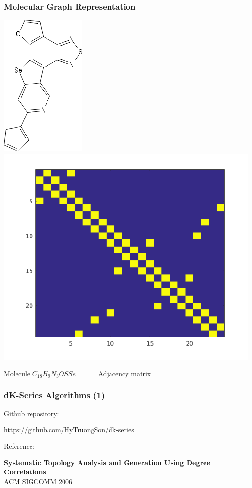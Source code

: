 \documentclass{beamer}
\begin{document}
\begin{frame}
\frametitle{Molecular Graph Representation}
\begin{justify}
\begin{center}
	\includegraphics[scale=0.5]{sketcher}
	\includegraphics[scale=0.5]{adjacency}
\end{center}
\begin{center}
Molecule $C_{18}H_9N_3OSSe$ \ \ \ \ \ \ Adjacency matrix
\end{center}
\end{justify}
\end{frame}

\begin{frame}
\frametitle{dK-Series Algorithms (1)}
\begin{justify}
Github repository: 
\begin{center}
\url{https://github.com/HyTruongSon/dk-series}
\end{center}
Reference: 
\begin{center}
\textbf{Systematic Topology Analysis and Generation Using Degree Correlations} \\ ACM SIGCOMM 2006
\end{center}
\end{justify}
\end{frame}
\end{document}
